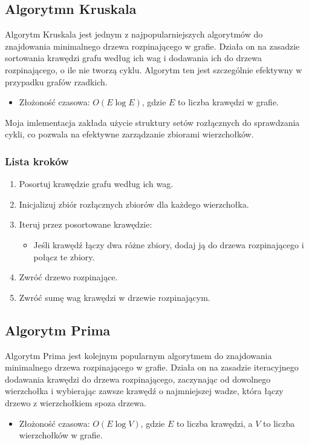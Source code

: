 \documentclass{article}
\begin{document}
\subsection{Algorytmn Kruskala}

Algorytm Kruskala jest jednym z najpopularniejszych algorytmów do znajdowania minimalnego drzewa rozpinającego w grafie.
Działa on na zasadzie sortowania krawędzi grafu według ich wag i dodawania ich do drzewa rozpinającego, o ile nie tworzą cyklu. 
Algorytm ten jest szczególnie efektywny w przypadku grafów rzadkich.

\begin{itemize}
    \item Złożoność czasowa: $O(E \log E)$, gdzie $E$ to liczba krawędzi w grafie.
\end{itemize}

Moja imlementacja zakłada użycie struktury setów rozłącznych do sprawdzania cykli, co pozwala na efektywne zarządzanie zbiorami wierzchołków.

\subsubsection{Lista kroków}
\begin{enumerate}
    \item Posortuj krawędzie grafu według ich wag.
    \item Inicjalizuj zbiór rozłącznych zbiorów dla każdego wierzchołka.
    \item Iteruj przez posortowane krawędzie:
    \begin{itemize}
        \item Jeśli krawędź łączy dwa różne zbiory, dodaj ją do drzewa rozpinającego i połącz te zbiory.
    \end{itemize}
    \item Zwróć drzewo rozpinające.
    \item Zwróć sumę wag krawędzi w drzewie rozpinającym.
\end{enumerate}

\subsection{Algorytm Prima}

Algorytm Prima jest kolejnym popularnym algorytmem do znajdowania minimalnego drzewa rozpinającego w grafie.
Działa on na zasadzie iteracyjnego dodawania krawędzi do drzewa rozpinającego, zaczynając od dowolnego wierzchołka i wybierając zawsze krawędź o najmniejszej wadze, która łączy drzewo z wierzchołkiem spoza drzewa.
\begin{itemize}
    \item Złożoność czasowa: $O(E \log V)$, gdzie $E$ to liczba krawędzi, a $V$ to liczba wierzchołków w grafie.
\end{itemize}
\end{document}
